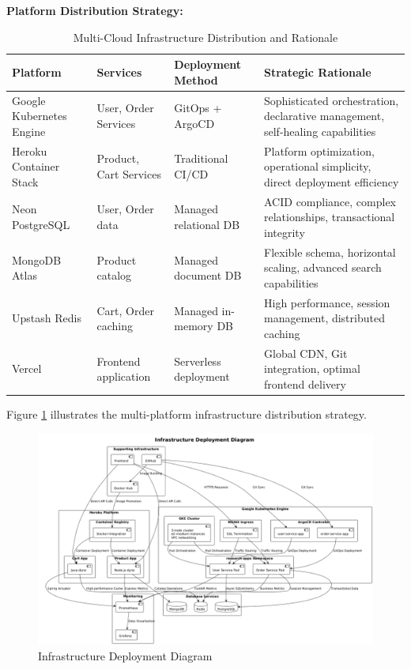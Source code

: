 \textbf{Platform Distribution Strategy:}

\begin{table}[H]
\centering
\caption{Multi-Cloud Infrastructure Distribution and Rationale}
\label{tab:infrastructure-distribution}
\begin{tabular}{|p{3cm}|p{3cm}|p{3cm}|p{5cm}|}
\hline
\textbf{Platform} & \textbf{Services} & \textbf{Deployment Method} & \textbf{Strategic Rationale} \\
\hline
Google Kubernetes Engine & User, Order Services & GitOps + ArgoCD & Sophisticated orchestration, declarative management, self-healing capabilities \\
\hline
Heroku Container Stack & Product, Cart Services & Traditional CI/CD & Platform optimization, operational simplicity, direct deployment efficiency \\
\hline
Neon PostgreSQL & User, Order data & Managed relational DB & ACID compliance, complex relationships, transactional integrity \\
\hline
MongoDB Atlas & Product catalog & Managed document DB & Flexible schema, horizontal scaling, advanced search capabilities \\
\hline
Upstash Redis & Cart, Order caching & Managed in-memory DB & High performance, session management, distributed caching \\
\hline
Vercel & Frontend application & Serverless deployment & Global CDN, Git integration, optimal frontend delivery \\
\hline
\end{tabular}
\end{table}

Figure \ref{fig:infrastructure-deployment-diagram} illustrates the multi-platform infrastructure distribution strategy.

\begin{figure}[H]
\centering
\includegraphics[width=1.0\textwidth]{figures/Infrastructure-Deployment-Diagram.png}
\caption{Infrastructure Deployment Diagram}
\label{fig:infrastructure-deployment-diagram}
\end{figure}


